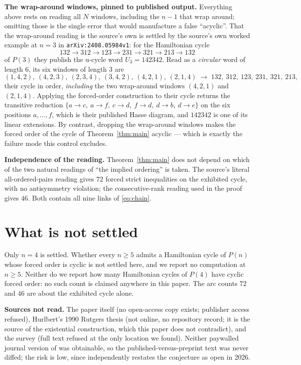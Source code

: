\documentclass[11pt]{amsart}
\begin{document}
\noindent\textbf{The wrap-around windows, pinned to published
output.} Everything above rests on reading all $N$ windows, including the $n-1$
that wrap around; omitting those is the single error that would manufacture a
false ``acyclic''. That the wrap-around reading is the source's own is settled
by the source's own worked example at $n=3$ in
\texttt{arXiv:2408.05984v1}: for the Hamiltonian cycle
\[
 132\to312\to123\to231\to321\to213\to132
\]
of $P(3)$ they publish the u-cycle word $U_3=142342$. Read as a
\emph{circular} word of length $6$, its six windows of length $3$ are
\[
 (1,4,2),\ (4,2,3),\ (2,3,4),\ (3,4,2),\ (4,2,1),\ (2,1,4)
 \;\longrightarrow\;
 132,\ 312,\ 123,\ 231,\ 321,\ 213,
\]
their cycle in order, \emph{including} the two wrap-around windows $(4,2,1)$
and $(2,1,4)$. Applying the forced-order construction to their cycle returns
the transitive reduction
$\{a\to c,\ a\to f,\ c\to d,\ f\to d,\ d\to b,\ d\to e\}$ on the six positions
$a,\dots,f$, which is their published Hasse diagram, and $142342$ is one of its
linear extensions. By contrast, dropping the wrap-around windows makes the
forced order of the cycle of Theorem~\ref{thm:main} acyclic --- which is exactly
the failure mode this control excludes.

\medskip\noindent\textbf{Independence of the reading.} Theorem~\ref{thm:main}
does not depend on which of the two natural readings of ``the implied
ordering'' is taken. The source's literal all-ordered-pairs reading gives $72$
forced strict inequalities on the exhibited cycle, with no antisymmetry
violation; the consecutive-rank reading used in the proof gives $46$. Both
contain all nine links of \eqref{eq:chain}.

\section{What is not settled}\label{sec:open}

Only $n=4$ is settled. Whether every $n\ge5$ admits a Hamiltonian cycle of
$P(n)$ whose forced order is cyclic is not settled here, and we report no
computation at $n\ge5$. Neither do we report how many Hamiltonian cycles of
$P(4)$ have cyclic forced order: no such count is claimed anywhere in this
paper. The arc counts $72$ and $46$ are about the exhibited cycle alone.

\medskip\noindent\textbf{Sources not read.} The paper \cite{CDG1992} itself (no
open-access copy
exists; publisher access refused), Hurlbert's 1990 Rutgers thesis
\cite{Hurlbert} (not online, no repository record; it is the source of the
existential construction, which this paper does not contradict), and the survey
\cite{JSH2009} (full text refused at the only location we found). Neither
paywalled journal version of \cite{KQ2024,KQ2026} was obtainable, so the
published-versus-preprint text was never diffed; the risk is low, since
\cite{KQ2026} independently restates the conjecture as open in 2026.
\end{document}
